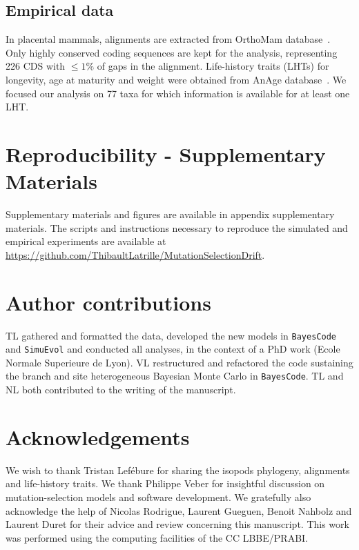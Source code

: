 \documentclass{MBE}
\begin{document}
	\subsection{Empirical data}
	In placental mammals, alignments are extracted from OrthoMam database~\citep{Ranwez2007,Scornavacca2019}.
	Only highly conserved coding sequences are kept for the analysis, representing 226 {CDS} with $\leq 1\%$ of gaps in the alignment.
	Life-history traits ({LHT}s) for longevity, age at maturity and weight were obtained from AnAge database~\citep{DEMAGALHAES2009,Tacutu2012}.
	We focused our analysis on 77 taxa for which information is available for at least one {LHT}.


	\section{Reproducibility - Supplementary Materials}
	Supplementary materials and figures are available in appendix supplementary materials.
	The scripts and instructions necessary to reproduce the simulated and empirical experiments are available at \url{https://github.com/ThibaultLatrille/MutationSelectionDrift}.

	\section{Author contributions}
	TL gathered and formatted the data, developed the new models in \texttt{BayesCode} and \texttt{SimuEvol} and conducted all analyses, in the context of a PhD work (Ecole Normale Superieure de Lyon).
	VL restructured and refactored the code sustaining the branch and site heterogeneous Bayesian Monte Carlo in \texttt{BayesCode}.
	TL and NL both contributed to the writing of the manuscript.

	\section{Acknowledgements}
	We wish to thank Tristan Lefébure for sharing the isopods phylogeny, alignments and life-history traits.
	We thank Philippe Veber for insightful discussion on mutation-selection models and software development.
	We gratefully also acknowledge the help of Nicolas Rodrigue, Laurent Gueguen, Benoit Nahbolz and Laurent Duret for their advice and review concerning this manuscript.
	This work was performed using the computing facilities of the CC LBBE/PRABI.

	
\end{document}
